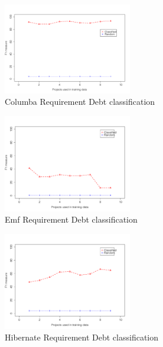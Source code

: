 \begin{figure}[thb!]
  \centering
  \includegraphics[width=0.50\textwidth]{figures/implementation_columba.pdf}
  \vspace{-3mm}
  \caption{Columba Requirement Debt classification}
  \label{fig:implementation_columba}
\end{figure}

\begin{figure}[thb!]
  \centering
  \includegraphics[width=0.50\textwidth]{figures/implementation_emf.pdf}
  \vspace{-3mm}
  \caption{Emf Requirement Debt classification}
  \label{fig:implementation_emf}
\end{figure}

\clearpage

\begin{figure}[thb!]
  \centering
  \includegraphics[width=0.50\textwidth]{figures/implementation_hibernate.pdf}
  \caption{Hibernate Requirement Debt classification}
  \label{fig:implementation_hibernate}
\end{figure}

